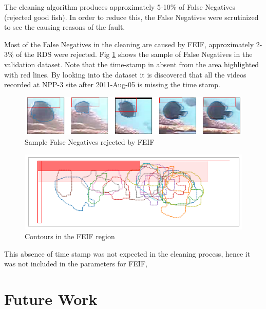 \documentclass[bsc,logo,twoside,fullspacing,parskip]{infthesis}
\begin{document}
The cleaning algorithm produces approximately 5-10\% of False Negatives (rejected good fish). 
In order to reduce this, the False Negatives were scrutinized to see the causing reasons of the fault.

Most of the False Negatives in the cleaning are caused by FEIF, approximately 2-3\% of the RDS were rejected. 
Fig \ref{fig:feiffail} shows the sample of False Negatives in the validation dataset.
Note that the time-stamp in absent from the area highlighted with red lines.
By looking into the dataset it is discovered that all the videos recorded at NPP-3 site after 2011-Aug-05 is missing the time stamp.

\begin{figure}[h]
    \centering
    \includegraphics[scale=0.40]{graph/FEIFfail.png}
    \caption{Sample False Negatives rejected by FEIF}
    \label{fig:feiffail}
\end{figure}

\begin{figure}[h]
    \centering
    \includegraphics[scale=0.30]{graph/feiffail.png}
    \caption{Contours in the FEIF region}
    \label{fig:feiffail2}
\end{figure}

This absence of time stamp was not expected in the cleaning process, hence it was not included in the parameters for FEIF,  %





\section{Future Work}
\label{sec:future}
\end{document}
